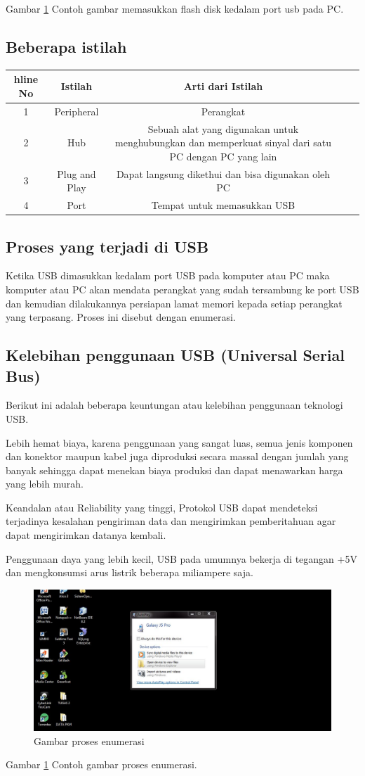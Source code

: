      Gambar \ref{Gambar} Contoh gambar memasukkan flash disk kedalam port usb pada PC.
	  
\subsection {Beberapa istilah}	  
\begin{table}[H]
\begin{tabular}{|c|c|c|c|c|}
hline
No & Istilah & Arti dari Istilah\\
\hline
1   & Peripheral & Perangkat\\
2   & Hub & Sebuah alat yang digunakan untuk menghubungkan dan memperkuat sinyal dari satu PC dengan PC yang lain\\
3   & Plug and Play & Dapat langsung dikethui dan bisa digunakan oleh PC\\
4   & Port & Tempat untuk memasukkan USB\\
\hline
\end{tabular}
\end{table}


\subsection {Proses yang terjadi di USB}
	Ketika USB dimasukkan kedalam port USB pada komputer atau PC maka komputer atau PC akan mendata perangkat yang sudah tersambung ke port USB dan kemudian dilakukannya persiapan lamat memori kepada setiap perangkat yang terpasang. Proses ini disebut dengan enumerasi.
	
\subsection {Kelebihan penggunaan USB (Universal Serial Bus)}
	Berikut ini adalah beberapa keuntungan atau kelebihan penggunaan teknologi USB.
\item
Lebih hemat biaya, karena penggunaan yang sangat luas, semua jenis komponen dan konektor maupun kabel juga diproduksi secara massal dengan jumlah yang banyak sehingga dapat menekan biaya produksi dan dapat menawarkan harga yang lebih murah.	
\item
Keandalan atau Reliability yang tinggi, Protokol USB dapat mendeteksi terjadinya kesalahan pengiriman data dan mengirimkan pemberitahuan agar dapat mengirimkan datanya kembali.
\item
Penggunaan daya yang lebih kecil, USB pada umumnya bekerja di tegangan +5V dan mengkonsumsi arus listrik beberapa miliampere saja.


	
	\begin{figure}[ht]
	\centerline{\includegraphics[width=1\textwidth]{figures/usb2.jpg}}
	\caption{Gambar proses enumerasi}
	\label{Gambar}
	\end{figure}
      
      Gambar \ref{Gambar} Contoh gambar proses enumerasi.
